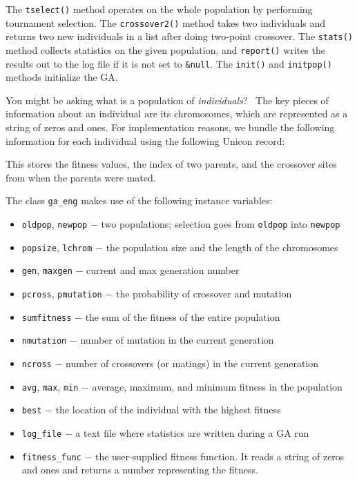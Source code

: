 The \texttt{tselect()} method operates on the whole population by
performing tournament selection. The \texttt{crossover2()} method takes
two individuals and returns two new individuals in a list after doing
two-point crossover. The \texttt{stats()} method collects statistics on
the given population, and \texttt{report()} writes the results out to
the log file if it is not set to \texttt{\&null}. The \texttt{init()}
and \texttt{initpop()} methods initialize the GA.

You might be asking what is a population of \textit{individuals}? \ The
key pieces of information about an individual are its chromosomes,
which are represented as a string of zeros and ones. For implementation
reasons, we bundle the following information for each individual using
the following Unicon record: 


This stores the fitness values, the index of two parents, and the
crossover sites from when the parents were mated.

The class \texttt{ga\_eng} makes use of the following
instance variables: 

\begin{itemize}
\item \texttt{oldpop}, \texttt{newpop} $-$ two populations; selection
goes from \texttt{oldpop} into \texttt{newpop}
\item \texttt{popsize}, \texttt{lchrom} $-$ the population size and the
length of the chromosomes
\item \texttt{gen}, \texttt{maxgen} $-$ current and max generation
number
\item \texttt{pcross}, \texttt{pmutation} $-$ the probability of
crossover and mutation
\item \texttt{sumfitness} $-$ the sum of the fitness of the entire
population
\item \texttt{nmutation} $-$ number of mutation in the current
generation
\item \texttt{ncross} $-$ number of crossovers (or matings) in the
current generation
\item \texttt{avg}, \texttt{max}, \texttt{min} $-$ average, maximum, and
minimum fitness in the population
\item \texttt{best} $-$ the location of the individual with the highest
fitness
\item \texttt{log\_file} $-$ a text file where statistics are written
during a GA run
\item \texttt{fitness\_func} $-$ the user-supplied fitness function. It
reads a string of zeros and ones and returns a number representing the
fitness.
\end{itemize}


